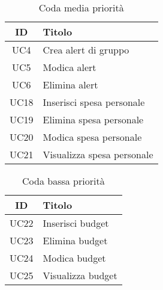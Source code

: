     \begin{table}[h!]
        \centering
        \begin{tabular}{|c|l|}
        \hline
        \textbf{ID} & \textbf{Titolo} \\ \hline
        UC4 & Crea alert di gruppo\\ \hline
        UC5 & Modica alert \\ \hline
        UC6 & Elimina alert \\ \hline
        UC18 & Inserisci spesa personale \\ \hline
        UC19 & Elimina spesa personale \\ \hline
        UC20 & Modica spesa personale \\ \hline
        UC21 & Visualizza spesa personale \\ \hline
        \end{tabular}
        \caption{Coda media priorità}
    \end{table}

    \begin{table}[h!]
        \centering
        \begin{tabular}{|c|l|}
        \hline
        \textbf{ID} & \textbf{Titolo} \\ \hline
        UC22 & Inserisci budget\\ \hline
        UC23 & Elimina budget \\ \hline
        UC24 & Modica budget \\ \hline
        UC25 & Visualizza budget \\ \hline
        \end{tabular}
        \caption{Coda bassa priorità}
    \end{table}
